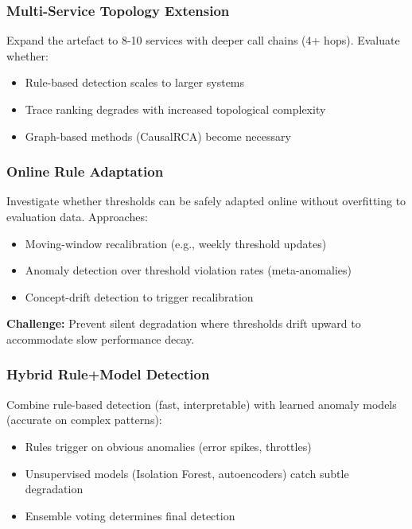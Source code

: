 \subsubsection{Multi-Service Topology Extension}

Expand the artefact to 8-10 services with deeper call chains (4+ hops). Evaluate whether:
\begin{itemize}
    \item Rule-based detection scales to larger systems
    \item Trace ranking degrades with increased topological complexity
    \item Graph-based methods (CausalRCA) become necessary
\end{itemize}

\subsubsection{Online Rule Adaptation}

Investigate whether thresholds can be safely adapted online without overfitting to evaluation data. Approaches:
\begin{itemize}
    \item Moving-window recalibration (e.g., weekly threshold updates)
    \item Anomaly detection over threshold violation rates (meta-anomalies)
    \item Concept-drift detection to trigger recalibration
\end{itemize}

\textbf{Challenge:} Prevent silent degradation where thresholds drift upward to accommodate slow performance decay.

\subsubsection{Hybrid Rule+Model Detection}

Combine rule-based detection (fast, interpretable) with learned anomaly models (accurate on complex patterns):
\begin{itemize}
    \item Rules trigger on obvious anomalies (error spikes, throttles)
    \item Unsupervised models (Isolation Forest, autoencoders) catch subtle degradation
    \item Ensemble voting determines final detection
\end{itemize}

